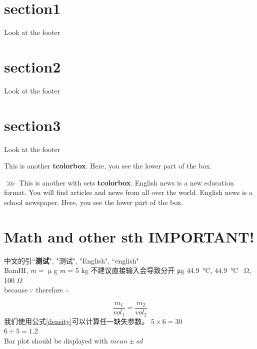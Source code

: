 \documentclass[a4paper,twoside]{report}
\begin{document}
\newpage

\section{section1}
Look at the footer
\zhlipsum[2-6]
\section{section2}
Look at the footer
\zhlipsum[2-6]
\section{section3}
Look at the footer
\zhlipsum[2-6]

\begin{tcolorbox}[title=\textbf{$\ggg$ My nice heading}]
This  is  another  \textbf{tcolorbox}.
\tcblower
Here,  you  see  the  lower  part  of  the  box.
\end{tcolorbox}

\begin{tcolorbox}[colback=white!95!red,colframe=black!30!red,title=\textbf{$\ggg$ My  nice  heading}]
$\ggg$ This  is  another with sets  \textbf{tcolorbox}.
English news is a new education format. You will find articles and news from all over the world. English news is a school newspaper.
\tcblower
Here,  you  see  the  lower  part  of  the  box.
\end{tcolorbox}

\section{Math and other sth IMPORTANT!}
中文的引\cite{RN865}``\textbf{测试}", "测试", "English", ``english"\\
BamHI, \textit{m} = $\upmu$g \textit{m} = 5 kg 不建议直接输入会导致分开 μg
\SI{44.9}{\celsius}, \SI{44.9}{\celsius} \SI{}{\ohm}, 100 $\Omega$\\
because $\because$ therefore $\therefore$

\begin{equation}
\frac{m_1}{vol_1}=\frac{m_2}{vol_2}
\label{density}
\end{equation}
我们使用公式\eqref{density}可以计算任一缺失参数。%
$5\times6 = 30$\\
$6\div5 = 1.2$\\
Bar plot should be displayed with $mean \pm sd$ \par%
\end{document}
